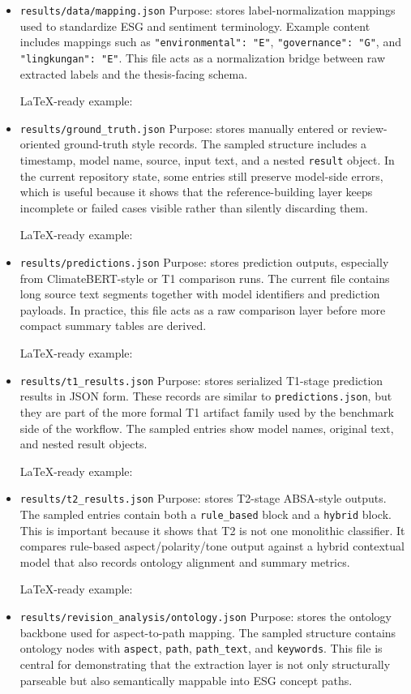 \documentclass[12pt,a4paper]{report}
\begin{document}
\begin{itemize}
\item
  \texttt{results/data/mapping.json} Purpose: stores label-normalization mappings used to standardize ESG and sentiment terminology. Example content includes mappings such as \texttt{"environmental":\ "E"}, \texttt{"governance":\ "G"}, and \texttt{"lingkungan":\ "E"}. This file acts as a normalization bridge between raw extracted labels and the thesis-facing schema.

  LaTeX-ready example:
\item
  \texttt{results/ground\_truth.json} Purpose: stores manually entered or review-oriented ground-truth style records. The sampled structure includes a timestamp, model name, source, input text, and a nested \texttt{result} object. In the current repository state, some entries still preserve model-side errors, which is useful because it shows that the reference-building layer keeps incomplete or failed cases visible rather than silently discarding them.

  LaTeX-ready example:
\item
  \texttt{results/predictions.json} Purpose: stores prediction outputs, especially from ClimateBERT-style or T1 comparison runs. The current file contains long source text segments together with model identifiers and prediction payloads. In practice, this file acts as a raw comparison layer before more compact summary tables are derived.

  LaTeX-ready example:
\item
  \texttt{results/t1\_results.json} Purpose: stores serialized T1-stage prediction results in JSON form. These records are similar to \texttt{predictions.json}, but they are part of the more formal T1 artifact family used by the benchmark side of the workflow. The sampled entries show model names, original text, and nested result objects.

  LaTeX-ready example:
\item
  \texttt{results/t2\_results.json} Purpose: stores T2-stage ABSA-style outputs. The sampled entries contain both a \texttt{rule\_based} block and a \texttt{hybrid} block. This is important because it shows that T2 is not one monolithic classifier. It compares rule-based aspect/polarity/tone output against a hybrid contextual model that also records ontology alignment and summary metrics.

  LaTeX-ready example:
\item
  \texttt{results/revision\_analysis/ontology.json} Purpose: stores the ontology backbone used for aspect-to-path mapping. The sampled structure contains ontology nodes with \texttt{aspect}, \texttt{path}, \texttt{path\_text}, and \texttt{keywords}. This file is central for demonstrating that the extraction layer is not only structurally parseable but also semantically mappable into ESG concept paths.


\end{itemize}
\end{document}
